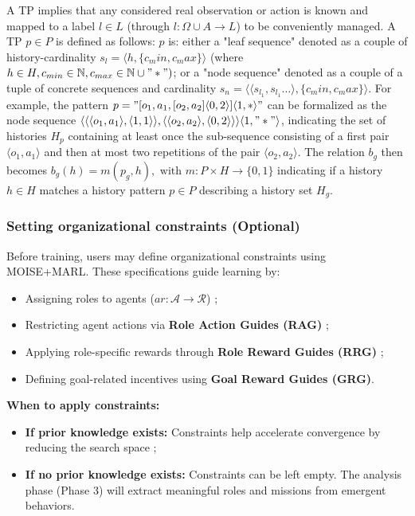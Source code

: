 \documentclass[pdflatex,sn-mathphys-num]{sn-jnl}%
\theoremstyle{thmstyleone}%
\theoremstyle{thmstyletwo}%
\theoremstyle{thmstylethree}%
\begin{document}
A TP implies that any considered real observation or action is known and mapped to a label $l \in L$ (through $l: \Omega \cup A \to L$) to be conveniently managed. A TP $p \in P$ is defined as follows: $p$ is: either a "leaf sequence" denoted as a couple of history-cardinality $s_l = \langle h, \{c_min,c_max\}\rangle$ (where $h \in H, c_{min} \in \mathbb{N}, c_{max} \in \mathbb{N} \cup "*")$; or a "node sequence" denoted as a couple of a tuple of concrete sequences and cardinality $s_n = \langle \langle s_{l_1}, s_{l_1}\dots \rangle, \{c_min,c_max\}\rangle$. For example, the pattern $p = \allowbreak "[o_1,a_1,[o_2,a_2]\langle0,2\rangle]\langle1,*\rangle"$ can be formalized as the node sequence $\allowbreak \langle \langle \langle o_1,a_1\rangle,\langle 1,1 \rangle \rangle, \langle \langle o_2,a_2 \rangle, \langle 0,2 \rangle \rangle \rangle \langle 1,"*" \rangle$, indicating the set of histories $H_p$ containing at least once the sub-sequence consisting of a first pair $\langle o_1,a_1\rangle$ and then at most two repetitions of the pair $\langle o_2,a_2 \rangle$.
The relation $b_g$ then becomes $b_g(h) = m(p_g,h), \text{ with } m: P \times H \to \{0,1\}$ indicating if a history $h \in H$ matches a history pattern $p \in P$ describing a history set $H_g$.

\subsubsection{Setting organizational constraints (Optional)}
Before training, users may define organizational constraints using MOISE+MARL. These specifications guide learning by:
\begin{itemize}
    \item Assigning roles to agents ($ar: \mathcal{A} \to \mathcal{R}$) ;
    \item Restricting agent actions via \textbf{Role Action Guides (RAG)} ;
    \item Applying role-specific rewards through \textbf{Role Reward Guides (RRG)} ;
    \item Defining goal-related incentives using \textbf{Goal Reward Guides (GRG)}.
\end{itemize}

\noindent \textbf{When to apply constraints:}
\begin{itemize}
    \item \textbf{If prior knowledge exists:} Constraints help accelerate convergence by reducing the search space ;
    \item \textbf{If no prior knowledge exists:} Constraints can be left empty. The analysis phase (Phase 3) will extract meaningful roles and missions from emergent behaviors.
\end{itemize}
\end{document}
